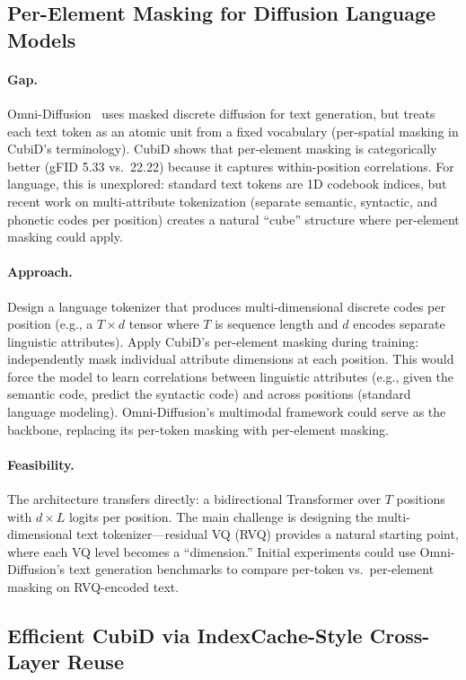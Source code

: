 \documentclass[11pt]{article}
\begin{document}
\subsection{Per-Element Masking for Diffusion Language Models}

\paragraph{Gap.}
Omni-Diffusion~\cite{omnidiff} uses masked discrete diffusion for text generation, but treats each text token as an atomic unit from a fixed vocabulary (per-spatial masking in CubiD's terminology).
CubiD shows that per-element masking is categorically better (gFID 5.33 vs.\ 22.22) because it captures within-position correlations.
For language, this is unexplored: standard text tokens are 1D codebook indices, but recent work on multi-attribute tokenization (separate semantic, syntactic, and phonetic codes per position) creates a natural ``cube'' structure where per-element masking could apply.

\paragraph{Approach.}
Design a language tokenizer that produces multi-dimensional discrete codes per position (e.g., a $T \times d$ tensor where $T$ is sequence length and $d$ encodes separate linguistic attributes).
Apply CubiD's per-element masking during training: independently mask individual attribute dimensions at each position.
This would force the model to learn correlations between linguistic attributes (e.g., given the semantic code, predict the syntactic code) and across positions (standard language modeling).
Omni-Diffusion's multimodal framework could serve as the backbone, replacing its per-token masking with per-element masking.

\paragraph{Feasibility.}
The architecture transfers directly: a bidirectional Transformer over $T$ positions with $d \times L$ logits per position.
The main challenge is designing the multi-dimensional text tokenizer---residual VQ (RVQ) provides a natural starting point, where each VQ level becomes a ``dimension.''
Initial experiments could use Omni-Diffusion's text generation benchmarks to compare per-token vs.\ per-element masking on RVQ-encoded text.

\subsection{Efficient CubiD via IndexCache-Style Cross-Layer Reuse}
\end{document}
